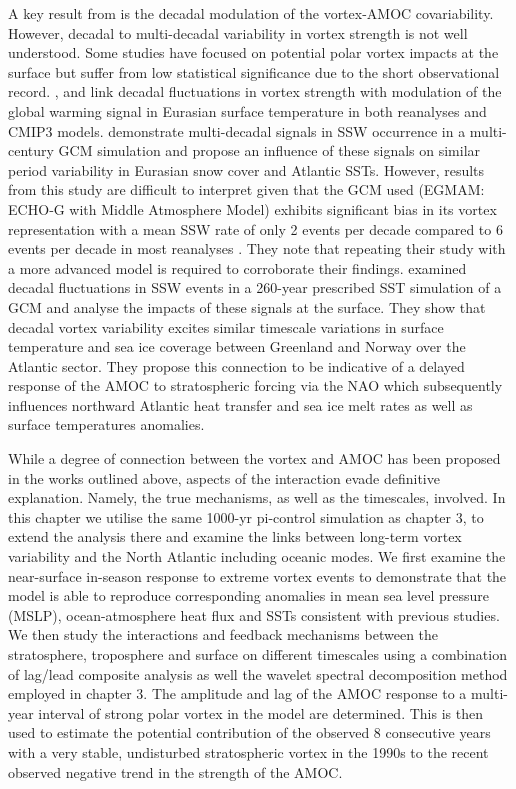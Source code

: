 A key result from \cite{reichlerStratospheric2012b} is the decadal modulation of the vortex-AMOC covariability. However, decadal to multi-decadal variability in vortex strength is not well understood. Some studies have focused on potential polar vortex impacts at the surface but suffer from low statistical significance due to the short observational record. \cite{garfinkelStratospheric2017b}, \cite{garfinkelEffect2015b} and \cite{cohenDecadal2009b} link decadal fluctuations in vortex strength with modulation of the global warming signal in Eurasian surface temperature in both reanalyses and CMIP3 models. \cite{schimankeMultidecadal2011b} demonstrate multi-decadal signals in SSW occurrence in a multi-century GCM simulation and propose an influence of these signals on similar period variability in Eurasian snow cover and Atlantic SSTs. However, results from this study are difficult to interpret given that the GCM used (EGMAM: ECHO‐G with Middle Atmosphere Model) exhibits significant bias in its vortex representation with a mean SSW rate of only 2 events per decade compared to 6 events per decade in most reanalyses \citep{ayarzaguenaRepresentation2019a}. They note that repeating their study with a more advanced model is required to corroborate their findings. \cite{manziniStratospheretroposphere2012b} examined decadal fluctuations in SSW events in a 260-year prescribed SST simulation of a GCM and analyse the impacts of these signals at the surface. They show that decadal vortex variability excites similar timescale variations in surface temperature and sea ice coverage between Greenland and Norway over the Atlantic sector. They propose this connection to be indicative of a delayed response of the AMOC to stratospheric forcing via the NAO which  subsequently influences northward Atlantic heat transfer and sea ice melt rates as well as surface temperatures anomalies. 

While a degree of connection between the vortex and AMOC has been proposed in the works outlined above, aspects of the interaction evade definitive explanation. Namely, the true mechanisms, as well as the timescales, involved. In this chapter we utilise the same 1000-yr pi-control simulation as chapter 3, to extend the analysis there and examine the links between long-term vortex variability and the North Atlantic including oceanic modes. We first examine the near-surface in-season response to extreme vortex events to demonstrate that the model is able to reproduce corresponding anomalies in mean sea level pressure (MSLP), ocean-atmosphere heat flux and SSTs consistent with previous studies. We then study the interactions and feedback mechanisms between the stratosphere, troposphere and surface on different timescales using a combination of lag/lead composite analysis as well the wavelet spectral decomposition method employed in chapter 3. The amplitude and lag of the AMOC response to a multi-year interval of strong polar vortex in the model are determined. This is then used to estimate the potential contribution of the observed 8 consecutive years with a very stable, undisturbed stratospheric vortex in the 1990s \citep{pawsonCold1999b} to the recent observed negative trend in the strength of the AMOC.


